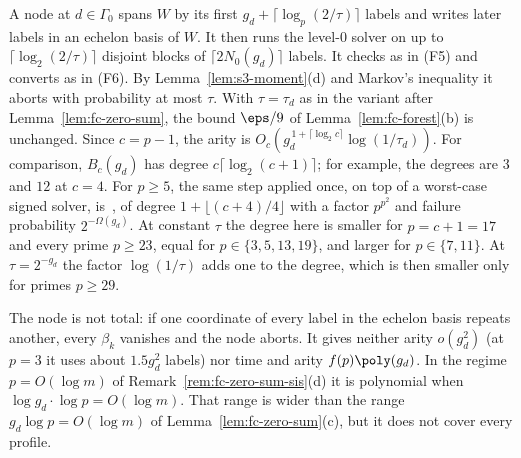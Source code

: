 \begin{remark}
A node at $d \in \Gamma_0$ spans $W$ by its first $g_d + \lceil\log_p(2/\tau)\rceil$ labels and writes later labels in an echelon basis of $W$. It then runs the level-$0$ solver on up to $\lceil\log_2(2/\tau)\rceil$ disjoint blocks of $\lceil2N_0(g_d)\rceil$ labels. It checks as in (F5) and converts as in (F6). By Lemma~\ref{lem:s3-moment}(d) and Markov's inequality it aborts with probability at most $\tau$. With $\tau = \tau_d$ as in the variant after Lemma~\ref{lem:fc-zero-sum}, the bound $\eps/9$ of Lemma~\ref{lem:fc-forest}(b) is unchanged. Since $c = p-1$, the arity is $O_c(g_d^{\,1+\lceil\log_2c\rceil}\log(1/\tau_d))$. For comparison, $B_c(g_d)$ has degree $c\lceil\log_2(c+1)\rceil$; for example, the degrees are $3$ and $12$ at $c = 4$. For $p \ge 5$, the same step applied once, on top of a worst-case signed solver, is~\cite[Theorem~1.10]{KothariMetgerODonnellShuttyWu2026}, of degree $1+\lfloor(c+4)/4\rfloor$ with a factor $p^{p^2}$ and failure probability $2^{-\Omega(g_d)}$. At constant $\tau$ the degree here is smaller for $p = c+1 = 17$ and every prime $p \ge 23$, equal for $p \in \{3,5,13,19\}$, and larger for $p \in \{7,11\}$. At $\tau = 2^{-g_d}$ the factor $\log(1/\tau)$ adds one to the degree, which is then smaller only for primes $p \ge 29$.

The node is not total: if one coordinate of every label in the echelon basis repeats another, every $\beta_k$ vanishes and the node aborts. It gives neither arity $o(g_d^2)$ (at $p = 3$ it uses about $1.5g_d^2$ labels) nor time and arity $f(p)\poly(g_d)$. In the regime $p = O(\log m)$ of Remark~\ref{rem:fc-zero-sum-sis}(d) it is polynomial when $\log g_d\cdot\log p = O(\log m)$. That range is wider than the range $g_d\log p = O(\log m)$ of Lemma~\ref{lem:fc-zero-sum}(c), but it does not cover every profile.


\end{remark}
